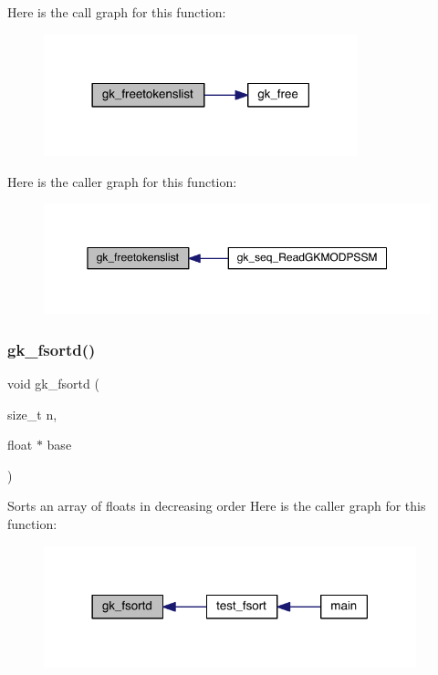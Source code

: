 Here is the call graph for this function\+:\nopagebreak
\begin{figure}[H]
\begin{center}
\leavevmode
\includegraphics[width=258pt]{a00077_a721067a5b35f35422d141ad8652021ec_cgraph}
\end{center}
\end{figure}
Here is the caller graph for this function\+:\nopagebreak
\begin{figure}[H]
\begin{center}
\leavevmode
\includegraphics[width=350pt]{a00077_a721067a5b35f35422d141ad8652021ec_icgraph}
\end{center}
\end{figure}
\mbox{\label{a00077_a48c8529cf48d82eedbf29d00cc257b8b}} 
\subsubsection{\texorpdfstring{gk\+\_\+fsortd()}{gk\_fsortd()}}
{\footnotesize\ttfamily void gk\+\_\+fsortd (\begin{DoxyParamCaption}\item[{size\+\_\+t}]{n,  }\item[{float $\ast$}]{base }\end{DoxyParamCaption})}

Sorts an array of floats in decreasing order Here is the caller graph for this function\+:\nopagebreak
\begin{figure}[H]
\begin{center}
\leavevmode
\includegraphics[width=306pt]{a00077_a48c8529cf48d82eedbf29d00cc257b8b_icgraph}
\end{center}
\end{figure}
\mbox{\label{a00077_a317c6a7c27cdf7ba3ebe40c948d7abcd}} 
